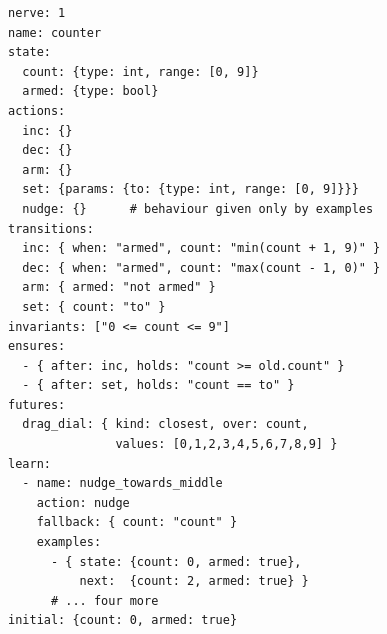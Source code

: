 \documentclass{article}
\theoremstyle{plain}
\theoremstyle{definition}
\theoremstyle{remark}
\newcommand{\Ec}{E_{\mathrm{c}}}
\newcommand{\Ej}{E_{\mathrm{J}}}
\newcommand{\Ef}{E_{\mathrm{F}}}
\newcommand{\Eth}{E_{\theta}}
\begin{document}
\begin{figure}[t]
\centering
\begin{minipage}[t]{0.46\textwidth}
\begin{lstlisting}
nerve: 1
name: counter
state:
  count: {type: int, range: [0, 9]}
  armed: {type: bool}
actions:
  inc: {}
  dec: {}
  arm: {}
  set: {params: {to: {type: int, range: [0, 9]}}}
  nudge: {}      # behaviour given only by examples
transitions:
  inc: { when: "armed", count: "min(count + 1, 9)" }
  dec: { when: "armed", count: "max(count - 1, 0)" }
  arm: { armed: "not armed" }
  set: { count: "to" }
invariants: ["0 <= count <= 9"]
ensures:
  - { after: inc, holds: "count >= old.count" }
  - { after: set, holds: "count == to" }
futures:
  drag_dial: { kind: closest, over: count,
               values: [0,1,2,3,4,5,6,7,8,9] }
learn:
  - name: nudge_towards_middle
    action: nudge
    fallback: { count: "count" }
    examples:
      - { state: {count: 0, armed: true},
          next:  {count: 2, armed: true} }
      # ... four more
initial: {count: 0, armed: true}
\end{lstlisting}
\end{minipage}\hfill
\begin{minipage}[t]{0.49\textwidth}
\vspace{0pt}
\centering
{}
\end{minipage}
\end{figure}
\end{document}

